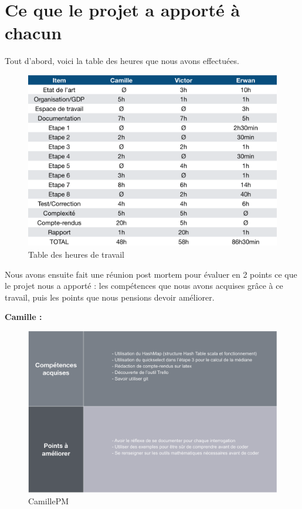 \documentclass{article}
\begin{document}
\newpage

 \section{ Ce que le projet a apporté à chacun}

    Tout d'abord, voici la table des heures que nous avons effectuées.

\begin{figure}[H]
    \centering
    \includegraphics[scale=0.5]{TabledesHeures.png}
    \caption{Table des heures de travail}
    \label{fig:tableheures}
\end{figure}

    Nous avons ensuite fait une réunion post mortem pour évaluer en 2 points ce que le projet nous a apporté : les compétences que nous avons acquises grâce à ce travail, puis les points que nous pensions devoir améliorer.
    
    \newpage
    
    \textbf{Camille :}
    \begin{figure}[H]
        \centering
        \includegraphics[scale=0.45]{CamillePM.png}
        \caption{CamillePM}
        \label{fig:camillepm}
    \end{figure}
    
\end{document}

